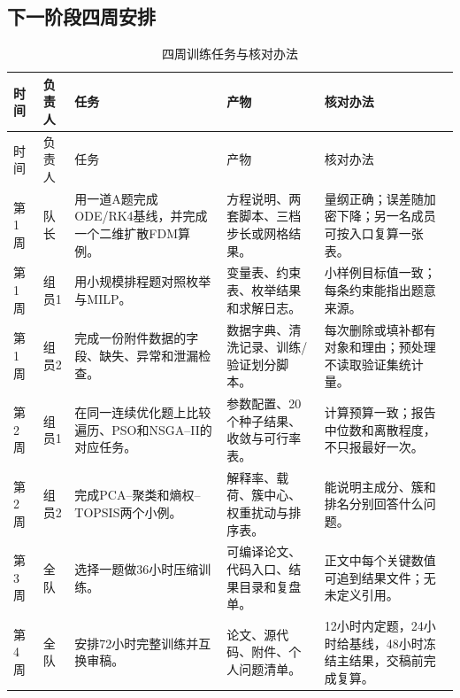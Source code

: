 \subsection{下一阶段四周安排}

\small
\begin{longtable}{p{1.3cm}p{1.3cm}p{3.9cm}p{4.7cm}p{4.15cm}}
\caption{四周训练任务与核对办法}\label{tab:four-week-plan}\\
\toprule
时间 & 负责人 & 任务 & 产物 & 核对办法\\
\midrule
\endfirsthead
\toprule
时间 & 负责人 & 任务 & 产物 & 核对办法\\
\midrule
\endhead
\bottomrule
\endfoot
第1周 & 队长 & 用一道A题完成ODE/RK4基线，并完成一个二维扩散FDM算例。
& 方程说明、两套脚本、三档步长或网格结果。 & 量纲正确；误差随加密下降；另一名成员可按入口复算一张表。\\
第1周 & 组员1 & 用小规模排程题对照枚举与MILP。 & 变量表、约束表、枚举结果和求解日志。 & 小样例目标值一致；每条约束能指出题意来源。\\
第1周 & 组员2 & 完成一份附件数据的字段、缺失、异常和泄漏检查。 & 数据字典、清洗记录、训练/验证划分脚本。 & 每次删除或填补都有对象和理由；预处理不读取验证集统计量。\\
第2周 & 组员1 & 在同一连续优化题上比较遍历、PSO和NSGA--II的对应任务。 & 参数配置、20个种子结果、收敛与可行率表。 & 计算预算一致；报告中位数和离散程度，不只报最好一次。\\
第2周 & 组员2 & 完成PCA--聚类和熵权--TOPSIS两个小例。 & 解释率、载荷、簇中心、权重扰动与排序表。 & 能说明主成分、簇和排名分别回答什么问题。\\
第3周 & 全队 & 选择一题做36小时压缩训练。 & 可编译论文、代码入口、结果目录和复盘单。 & 正文中每个关键数值可追到结果文件；无未定义引用。\\
第4周 & 全队 & 安排72小时完整训练并互换审稿。 & 论文、源代码、附件、个人问题清单。 & 12小时内定题，24小时给基线，48小时冻结主结果，交稿前完成复算。\\
\end{longtable}
\normalsize

